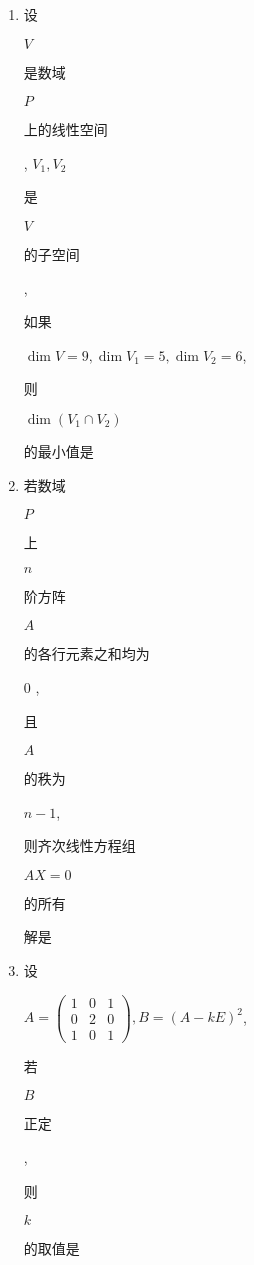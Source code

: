 \documentclass[10pt]{article}
\begin{document}
\begin{enumerate}
  \item \begin{CJK}{UTF8}{mj}设\end{CJK} $V$ \begin{CJK}{UTF8}{mj}是数域\end{CJK} $P$ \begin{CJK}{UTF8}{mj}上的线性空间\end{CJK}, $V_{1}, V_{2}$ \begin{CJK}{UTF8}{mj}是\end{CJK} $V$ \begin{CJK}{UTF8}{mj}的子空间\end{CJK}, \begin{CJK}{UTF8}{mj}如果\end{CJK} $\operatorname{dim} V=9, \operatorname{dim} V_{1}=5, \operatorname{dim} V_{2}=6$, \begin{CJK}{UTF8}{mj}则\end{CJK} $\operatorname{dim}\left(V_{1} \cap V_{2}\right)$ \begin{CJK}{UTF8}{mj}的最小值是\end{CJK}

  \item \begin{CJK}{UTF8}{mj}若数域\end{CJK} $P$ \begin{CJK}{UTF8}{mj}上\end{CJK} $n$ \begin{CJK}{UTF8}{mj}阶方阵\end{CJK} $A$ \begin{CJK}{UTF8}{mj}的各行元素之和均为\end{CJK} 0 , \begin{CJK}{UTF8}{mj}且\end{CJK} $A$ \begin{CJK}{UTF8}{mj}的秩为\end{CJK} $n-1$, \begin{CJK}{UTF8}{mj}则齐次线性方程组\end{CJK} $A X=0$ \begin{CJK}{UTF8}{mj}的所有\end{CJK} \begin{CJK}{UTF8}{mj}解是\end{CJK}

  \item \begin{CJK}{UTF8}{mj}设\end{CJK} $A=\left(\begin{array}{lll}1 & 0 & 1 \\ 0 & 2 & 0 \\ 1 & 0 & 1\end{array}\right), B=(A-k E)^{2}$, \begin{CJK}{UTF8}{mj}若\end{CJK} $B$ \begin{CJK}{UTF8}{mj}正定\end{CJK}, \begin{CJK}{UTF8}{mj}则\end{CJK} $k$ \begin{CJK}{UTF8}{mj}的取值是\end{CJK}


\end{enumerate}
\end{document}
